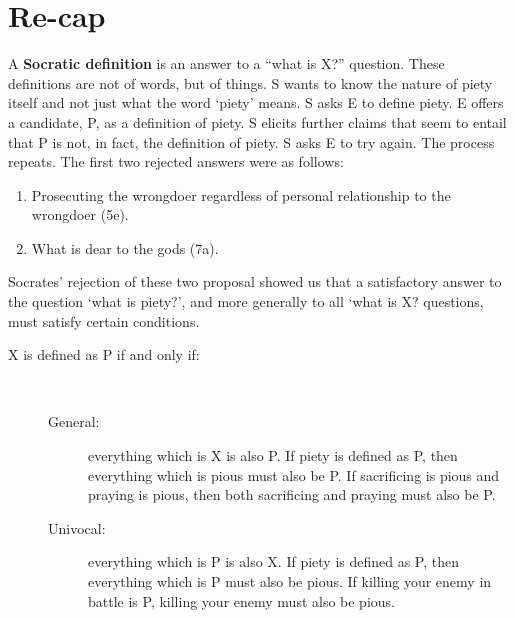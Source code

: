 \documentclass[oneside]{article}
\begin{document}
\section*{Re-cap}


A \textbf{Socratic definition} is an answer to a ``what is X?'' question. These definitions are not of words, but of things. S wants to know the nature of piety itself and not just what the word `piety' means. S asks E to define piety. E offers a candidate, P, as a definition of piety. S elicits further claims that seem to entail that P is not, in fact, the definition of piety. S asks E to try again. The process repeats. The first two rejected answers were as follows:

\begin{enumerate}
\item Prosecuting the wrongdoer regardless of personal relationship to the wrongdoer (5e).
\item What is dear to the gods (7a).
\end{enumerate}
Socrates' rejection of these two proposal showed us that a satisfactory answer to the question `what is piety?', and more generally to all `what is X? questions, must satisfy certain conditions.
\begin{description}
\item[ X is defined as P if and only if:]\
\begin{description}
\item[General:] everything which is X is also P. If piety is defined as P, then everything which is pious must also be P. If sacrificing is pious and praying is pious, then both sacrificing and praying must also be P. 
\item[Univocal:] everything which is P is also X. If piety is defined as P, then everything which is P must also be pious. If killing your enemy in battle is P, killing your enemy must also be pious. 
\end{description}
\end{description}
\end{document}
